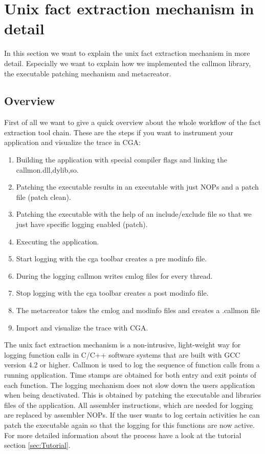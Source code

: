 
\section{Unix fact extraction mechanism in detail}

In this section we want to explain the unix fact extraction mechanism in more detail. Especially we want to explain how we implemented the callmon library, the executable patching mechanism and metacreator.

\subsection{Overview}

First of all we want to give a quick overview about the whole workflow of the fact extraction tool chain. These are the steps if you want to instrument your application and visualize the trace in CGA:

\begin{enumerate}
	\item Building the application with special compiler flags and linking the callmon.{dll,dylib,so}.
	\item Patching the executable results in an executable with just NOPs and a patch file (patch clean).
	\item Patching the executable with the help of an include/exclude file so that we just have specific logging enabled (patch).
	\item Executing the application.
	\item Start logging with the cga toolbar creates a pre modinfo file.
	\item During the logging callmon writes cmlog files for every thread.
	\item Stop logging with the cga toolbar creates a post modinfo file.
	\item The metacreator takes the cmlog and modinfo files and creates a .callmon file
	\item Import and visualize the trace with CGA.
\end{enumerate}

The unix fact extraction mechanism is a non-intrusive, light-weight way for logging function calls in C/C++ software systems that are built with GCC version 4.2 or higher. Callmon is used to log the sequence of function calls from a running application. Time stamps are obtained for both entry and exit points of each function. The logging mechanism does not slow down the users application when being deactivated. This is obtained by patching the executable and libraries files of the application. All assembler instructions, which are needed for logging are replaced by assembler NOPs. If the user wants to log certain activities he can patch the executable again so that the logging for this functions are now active. For more detailed information about the process have a look at the tutorial section \ref{sec:Tutorial}.

